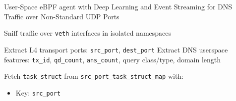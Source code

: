 \documentclass [11pt, proquest] {uwthesis}[2020/02/24]
\begin{document}
\begin{algorithm}[H]
\caption{User-Space eBPF agent with Deep Learning and Event Streaming for DNS Traffic over Non-Standard UDP Ports}
\label{sec:alg6}

\small %


Sniff traffic over \texttt{veth} interfaces in isolated namespaces\;


Extract L4 transport ports: \texttt{src\_port}, \texttt{dest\_port}\;
Extract DNS userspace features: \texttt{tx\_id}, \texttt{qd\_count}, \texttt{ans\_count}, query class/type, domain length\;

Fetch \texttt{task\_struct} from \texttt{src\_port\_task\_struct\_map} with:
    \begin{itemize}[nosep]
        \item Key: \texttt{src\_port} 
    \end{itemize}


\end{algorithm}
\end{document}
